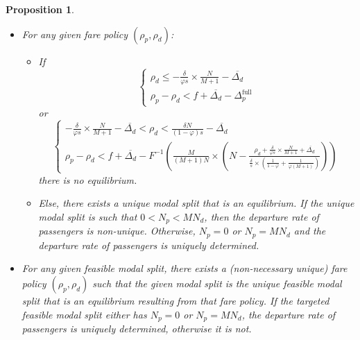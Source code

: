 \documentclass[english, a4paper]{article}
\theoremstyle{plain}
\newtheorem{prop}{Proposition}
\theoremstyle{definition}
\theoremstyle{remark}
\begin{document}
\begin{prop}
\label{prop_feasible_modal_splits_and_fare_policies}
    \begin{itemize}
        \item For any given fare policy $(\rho _p,\rho _d)$:
        \begin{itemize}
            \item If
            \begin{equation*}
                \left\{
                \begin{array}{l}
                    \rho _d \leq - \frac{\delta}{\varphi s}\times \frac{N}{M+1} - \overline{\Delta _d}\\
                    \rho _p - \rho _d < f + \overline{\Delta _d} - \Delta _p^{\text{full}}
                \end{array}
                \right.
            \end{equation*}or
            \begin{equation*}
                \left\{
                \begin{array}{l}
                    -\frac{\delta}{\varphi s}\times \frac{N}{M+1} - \overline{\Delta _d} < \rho _d < \frac{\delta N}{(1-\varphi ) s} - \overline{\Delta _d}\\
                    \rho _p - \rho _d < f + \overline{\Delta _d} - F^{-1}\left( \frac{M}{(M+1)N} \times \left( N - \frac{\rho_d + \frac{\delta}{\varphi s}\times \frac{N}{M+1} + \overline{\Delta _d}}{\frac{\delta}{s}\times \left( \frac{1}{1-\varphi} + \frac{1}{\varphi (M+1)} \right)} \right)\right)
                \end{array}
                \right.
        \end{equation*}there is no equilibrium.
        
            \item Else, there exists a unique modal split that is an equilibrium. If the unique modal split is such that $0 < N_p < MN_d$, then the departure rate of passengers is non-unique. Otherwise, $N_p = 0$ or $N_p = MN_d$ and the departure rate of passengers is uniquely determined.

        \end{itemize}
        
        \item For any given feasible modal split, there exists a (non-necessary unique) fare policy $(\rho _p, \rho _d)$ such that the given modal split is the unique feasible modal split that is an equilibrium resulting from that fare policy. If the targeted feasible modal split either has $N_p = 0$ or $N_p = MN_d$, the departure rate of passengers is uniquely determined, otherwise it is not.
    \end{itemize}
\end{prop}
\end{document}
